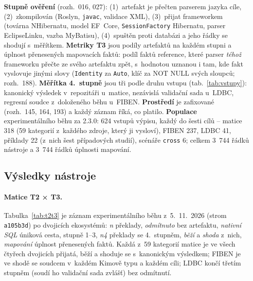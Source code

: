 \documentclass{article}
\begin{document}
\textbf{Stupně ověření} (rozh.~016, 027): (1)~artefakt je přečten parserem jazyka cíle, (2)~zkompilován (Roslyn, \texttt{javac}, validace XML), (3)~přijat frameworkem (továrna NHibernatu, model EF~Core, \texttt{SessionFactory} Hibernatu, parser EclipseLinku, vazba MyBatisu), (4)~spuštěn proti databázi a jeho řádky se shodují s~měřítkem. \textbf{Metriky T3} jsou podíly artefaktů na každém stupni a úplnost přenesených mapovacích faktů: podíl faktů reference, které parser \emph{téhož} frameworku přečte ze svého artefaktu zpět, s~hodnotou uznanou i tam, kde fakt vyslovuje jinými slovy (\texttt{Identity} za \texttt{Auto}, klíč za NOT NULL svých sloupců; rozh.~188). \textbf{Měřítka 4.~stupně} jsou tři podle druhu vstupu (tab.~\ref{tab:vstupy}): kanonický výsledek v~repozitáři u~matice, nezávislá validační sada u~LDBC, regresní soudce z~doloženého běhu u~FIBEN. \textbf{Prostředí} je zafixované (rozh.~145, 164, 193) a každý záznam říká, co platilo. \textbf{Populace} experimentálního běhu za 2.3.0: 624 vstupů výpisu, každý do šesti cílů -- matice 318 (59 kategorií z~každého zdroje, který ji vysloví), FIBEN 237, LDBC 41, příklady 22 (z~nich šest případových studií), scénáře \texttt{cross} 6; celkem 3~744 řádků nástroje a 3~744 řádků úplnosti mapování.

\subsection{Výsledky nástroje}

\paragraph{Matice T2 × T3.} Tabulka~\ref{tab:t2t3} je záznam experimentálního běhu z~5.~11.~2026 (strom \texttt{a105b3d}) po dvojicích ekosystémů: \emph{n} překlady, \emph{odmítnuto} bez artefaktu, \emph{nativní SQL} úniková cesta, stupně 1--3, \emph{n4} překlady se 4.~stupněm, \emph{běží} a \emph{shoda} z~nich, \emph{mapování} úplnost přenesených faktů. Každá z~59 kategorií matice je ve všech čtyřech dvojicích přijatá, běží a shoduje se s~kanonickým výsledkem; FIBEN je ve shodě se soudcem v~každém Kimově typu a každém cíli; LDBC končí třetím stupněm (soudí ho validační sada zvlášť) bez odmítnutí.
\end{document}
